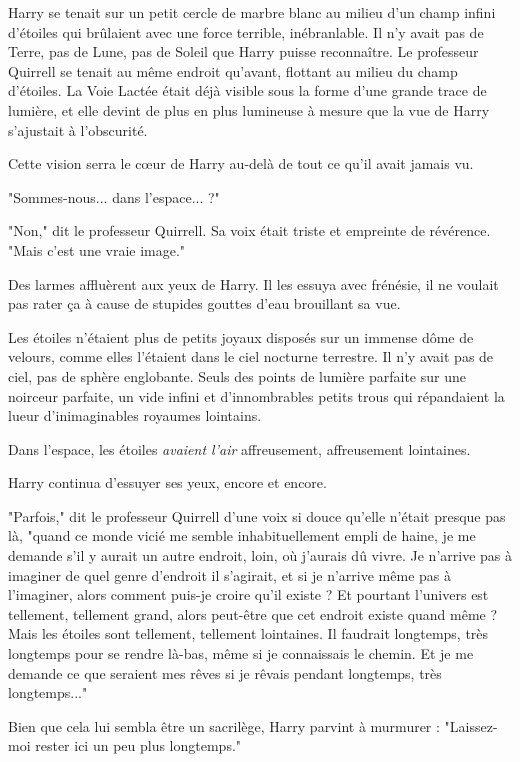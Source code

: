 Harry se tenait sur un petit cercle de marbre blanc au milieu d'un champ infini d'étoiles qui brûlaient avec une force terrible, inébranlable. Il n'y avait pas de Terre, pas de Lune, pas de Soleil que Harry puisse reconnaître. Le professeur Quirrell se tenait au même endroit qu'avant, flottant au milieu du champ d'étoiles. La Voie Lactée était déjà visible sous la forme d'une grande trace de lumière, et elle devint de plus en plus lumineuse à mesure que la vue de Harry s'ajustait à l'obscurité.

Cette vision serra le cœur de Harry au-delà de tout ce qu'il avait jamais vu.

"Sommes-nous... dans l'espace... ?"

"Non," dit le professeur Quirrell. Sa voix était triste et empreinte de révérence. "Mais c'est une vraie image."

Des larmes affluèrent aux yeux de Harry. Il les essuya avec frénésie, il ne voulait pas rater ça à cause de stupides gouttes d'eau brouillant sa vue.

Les étoiles n'étaient plus de petits joyaux disposés sur un immense dôme de velours, comme elles l'étaient dans le ciel nocturne terrestre. Il n'y avait pas de ciel, pas de sphère englobante. Seuls des points de lumière parfaite sur une noirceur parfaite, un vide infini et d'innombrables petits trous qui répandaient la lueur d'inimaginables royaumes lointains.

Dans l'espace, les étoiles \emph{avaient l'air}  affreusement, affreusement lointaines.

Harry continua d'essuyer ses yeux, encore et encore.

"Parfois," dit le professeur Quirrell d'une voix si douce qu'elle n'était presque pas là, "quand ce monde vicié me semble inhabituellement empli de haine, je me demande s'il y aurait un autre endroit, loin, où j'aurais dû vivre. Je n'arrive pas à imaginer de quel genre d'endroit il s'agirait, et si je n'arrive même pas à l'imaginer, alors comment puis-je croire qu'il existe ? Et pourtant l'univers est tellement, tellement grand, alors peut-être que cet endroit existe quand même ? Mais les étoiles sont tellement, tellement lointaines. Il faudrait longtemps, très longtemps pour se rendre là-bas, même si je connaissais le chemin. Et je me demande ce que seraient mes rêves si je rêvais pendant longtemps, très longtemps..."

Bien que cela lui sembla être un sacrilège, Harry parvint à murmurer : "Laissez-moi rester ici un peu plus longtemps."

